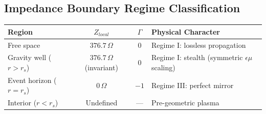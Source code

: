 \subsection*{Impedance Boundary Regime Classification}
\begin{center}
\small
\renewcommand{\arraystretch}{1.2}
\begin{tabular}{lccl}
\toprule
\textbf{Region} & \textbf{$Z_{local}$} & \textbf{$\Gamma$} & \textbf{Physical Character} \\
\midrule
Free space             & $376.7\,\Omega$ & $0$   & Regime I: lossless propagation \\
Gravity well ($r > r_s$) & $376.7\,\Omega$ (invariant) & $0$   & Regime I: stealth (symmetric $\epsilon\mu$ scaling) \\
Event horizon ($r = r_s$) & $0\,\Omega$  & $-1$ & Regime III: perfect mirror \\
Interior ($r < r_s$)     & Undefined    & ---   & Pre-geometric plasma \\
\bottomrule
\end{tabular}
\end{center}